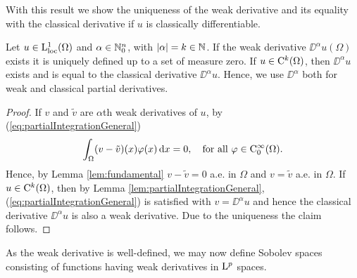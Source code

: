 With this result we show the uniqueness of the weak derivative and its equality with the classical derivative if $u$ is classically differentiable.

\begin{lem}
  Let $u \in \mathrm{L}_{\operatorname{loc}}^1(\Omega)$ and $\alpha \in \mathbb{N}_0^n$, with $|\alpha| = k \in \mathbb{N}$. 
  If the weak derivative $\DD^\alpha u(\Omega)$ exists it is uniquely defined up to a set of measure zero.
  If $u \in \mathrm{C}^k(\Omega)$, then $\DD^\alpha u$ exists and is equal to the classical derivative $\DD^\alpha u$. 
  Hence, we use $\DD^\alpha$ both for weak and classical partial derivatives.
\end{lem}

\begin{proof}
  If $v$ and $\tilde v$ are $\alpha$th weak derivatives of $u$, by (\ref{eq:partialIntegrationGeneral})
  $$
  \int_\Omega (v - \tilde v) (x) \varphi(x) \, {\operatorname{d}\!{x}} = 0, \quad\text{for all } \varphi \in \mathrm{C}_0^\infty(\Omega).
  $$
  Hence, by Lemma \ref{lem:fundamental} $v - \tilde v = 0$ a.e. in $\Omega$ and $v = \tilde v$ a.e. in $\Omega$.
  If $u \in \mathrm{C}^k(\Omega)$, then by Lemma \ref{lem:partialIntegrationGeneral}, (\ref{eq:partialIntegrationGeneral}) is satisfied with $v = \DD^\alpha u$ and hence the classical derivative $\DD^\alpha u$ is also a weak derivative.
  Due to the uniqueness the claim follows.
\end{proof}

As the weak derivative is well-defined, we may now define Sobolev spaces consisting of functions having weak derivatives in $\mathrm{L}^p$ spaces.

